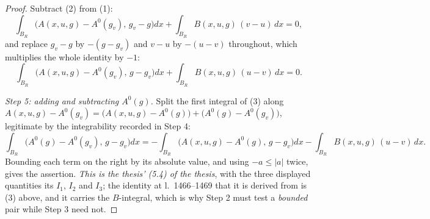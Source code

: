 \begin{proof}
Subtract (2) from (1):
\[
\int_{B_R}\bigl(A(x,u,g)-A^0(g_v),\,g_v-g\bigr)dx
+\int_{B_R}B(x,u,g)\,(v-u)\,dx=0 ,
\]
and replace $g_v-g$ by $-(g-g_v)$ and $v-u$ by $-(u-v)$ throughout, which
multiplies the whole identity by $-1$:
\[
\int_{B_R}\bigl(A(x,u,g)-A^0(g_v),\,g-g_v\bigr)dx
+\int_{B_R}B(x,u,g)\,(u-v)\,dx=0 .
\tag{3}
\]

\emph{Step 5: adding and subtracting $A^0(g)$.}  Split the first integral of (3)
along $A(x,u,g)-A^0(g_v)=\bigl(A(x,u,g)-A^0(g)\bigr)+\bigl(A^0(g)-A^0(g_v)\bigr)$,
legitimate by the integrability recorded in Step 4:
\[
\int_{B_R}\bigl(A^0(g)-A^0(g_v),\,g-g_v\bigr)dx
=-\int_{B_R}\bigl(A(x,u,g)-A^0(g),\,g-g_v\bigr)dx
-\int_{B_R}B(x,u,g)\,(u-v)\,dx .
\]
Bounding each term on the right by its absolute value, and using
$-a\le|a|$ twice, gives the assertion.  \emph{This is the thesis'
(5.4) of the thesis}, with the three displayed quantities its $I_1$, $I_2$ and
$I_3$; the identity at l.~1466--1469 that it is derived from is (3) above, and
it carries the $B$-integral, which is why Step 2 must test a \emph{bounded}
pair while Step 3 need not.
\end{proof}
